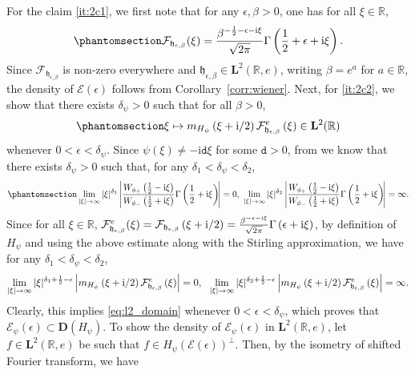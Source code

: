 \documentclass[12pt]{amsart}
\newcommand{\hlabel}{\phantomsection\label}
\numberwithin{equation}{section}
\newcommand{\bb}{\mathbb}
\newcommand{\cc}{\mathcal}
\newcommand{\tred}{}
\newcommand{\mf}{\mathfrak}
\newcommand{\ttt}{\mathtt}
\newcommand{\bmrm}[2][2]{\mathbf{#2}^{#1}}
\newcommand{\fou}{\mathcal{F}}
\newcommand{\Hpsi}{H_\psi}
\newcommand{\fouho}{\cc{F}^{e}}
\newcommand{\D}{\mathbf{D}}
\newcommand{\eps}{\epsilon}
\newcommand{\heb}{\mf{h}_{\eps,\beta}}
\renewcommand{\i}{\mathrm{i}}
\newcommand{\LRe}{\bmrm{L}(\bb{R},e)}
\theoremstyle{definition}
\theoremstyle{assump}
\theoremstyle{remark}
\begin{document}
{For the claim \eqref{it:2c1}, we first note that for any $\epsilon,\beta>0$, one has for all $\xi\in\bb{R}$,
\begin{align}\hlabel{eq:fourier_trans}
	\fou_{\heb}(\xi)=\frac{\beta^{-\frac{1}{2}-\eps-\i\xi}}{\sqrt{2\pi}}\Gamma\left(\frac{1}{2}+\eps+\i\xi\right).
\end{align}
Since $\fou_{\heb}$ is non-zero everywhere and $\heb\in\bmrm{L}(\bb{R},e)$, writing $\beta=e^a$ for $a\in\bb{R}$, the density of $\cc{E}(\eps)$ follows from Corollary~\ref{corr:wiener}. Next, for \eqref{it:2c2}, we show that there exists $\delta_\psi>0$ such that for all $\beta>0$,
\begin{align}\hlabel{eq:l2_domain}
	\xi\mapsto m_{H_\psi}\left(\xi+{\rm{i}}/2\right)\fouho_{\heb}\left(\xi\right)\in\bmrm{L}(\bb{R})
\end{align}
whenever $0<\eps<\delta_\psi$. Since $\psi(\xi)\neq -\i\ttt{d}\xi$ for some $\ttt{d}>0$, from \cite[Theorem~2.3(1)]{patie2018} we know that there exists $\delta_\psi>0$ such that, for any  $\delta_1<\delta_\psi<\delta_2$,
\begin{align}\hlabel{eq:delta_psi}
	\lim_{|\xi|\to\infty}|\xi|^{\delta_1}\left|\frac{W_{\phi_+}\left(\frac{1}{2}-\i\xi\right)}{W_{\phi_-}\left(\frac{1}{2}+\i\xi\right)}\Gamma\left(\frac{1}{2}+\i\xi\right)\!\right|=0, \  \lim_{|\xi|\to\infty}|\xi|^{\delta_2}\left|\frac{W_{\phi_+}\left(\frac{1}{2}-\i\xi\right)}{W_{\phi_-}\left(\frac{1}{2}+\i\xi\right)}\Gamma\left(\frac{1}{2}+\i\xi\right)\!\right|=\infty.
\end{align}
Since for all $\xi\in\bb{R}$, $\fouho_{\heb}(\xi)=\fou_{\heb}\left(\xi+{\rm{i}}/2\right)=\frac{\beta^{-\eps-\i\xi}}{\sqrt{2\pi}}\Gamma\left(\eps+\i\xi\right)$, by definition of $\tred{\Hpsi}$ and using the above estimate along with the Stirling approximation, we have for any $\delta_1<\delta_\psi<\delta_2$,
\begin{align*}
	\lim_{|\xi|\to\infty}|\xi|^{\delta_1+\frac{1}{2}-\eps}\left|m_{H_\psi}\left(\xi+{\rm{i}}/2\right)\fouho_{\heb}\left(\xi\right)\right|=0, \ \ \lim_{|\xi|\to\infty}|\xi|^{\delta_2+\frac{1}{2}-\eps}\left|m_{H_\psi}\left(\xi+{\rm{i}}/2\right)\fouho_{\heb}\left(\xi\right)\right|=\infty.
\end{align*}
Clearly, this implies \eqref{eq:l2_domain}  whenever $0<\eps<\delta_\psi$, which proves that $\cc{E}_\psi(\eps)\subset \D(H_\psi)$. To show the density of $\cc{E}_\psi(\eps)$ in $\LRe$, let $f\in\bmrm{L}(\bb{R},e)$ be such that $f\in\Hpsi(\cc{E}(\eps))^\perp$. Then, by the isometry of shifted Fourier transform, we have
}
\end{document}
